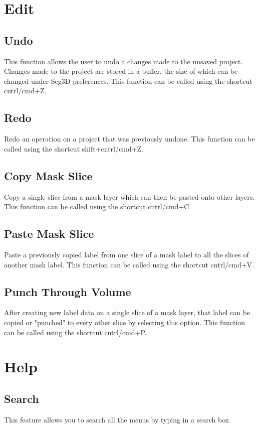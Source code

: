 \documentclass[fleqn,11pt,openany]{book}
\begin{document}
\section{Edit}

\subsection{Undo}
This function allows the user to undo a changes made to the unsaved project.  Changes made to the project are stored
in a buffer, the size of which can be changed under Seg3D preferences. This function can be called using the shortcut cntrl/cmd+Z.


\subsection{Redo}
Redo an operation on a project that was previously undone. This function can be called using the shortcut shift+cntrl/cmd+Z.


\subsection{Copy Mask Slice}
Copy a single slice from a mask layer which can then be pasted onto other layers. This function can be called using the shortcut cntrl/cmd+C.


\subsection{Paste Mask Slice}
Paste a previously copied label from one slice of a mask label to all the slices of another mask label. This function can be called using the shortcut cntrl/cmd+V.


\subsection{Punch Through Volume}
After creating new label data on a single slice of a mask layer, that label can be copied or "punched" to every other slice by
selecting this option. This function can be called using the shortcut cntrl/cmd+P.


\section{Help}
\subsection{Search}
This feature allows you to search all the menus by typing in a search box.
\end{document}
